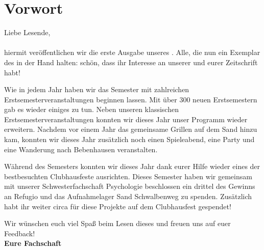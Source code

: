 \section{Vorwort}
\Large
Liebe Lesende,\\
\\
\normalsize
hiermit veröffentlichen wir die erste Ausgabe unseres \nameit. Alle, die nun ein Exemplar des \nameit \space in der Hand halten: schön, dass ihr Interesse an unserer und eurer Zeitschrift habt! 

Wie in jedem Jahr haben wir das Semester mit zahlreichen Erstsemesterveranstaltungen beginnen lassen. Mit über 300 neuen Erstsemestern gab es wieder einiges zu tun.
Neben unseren klassischen Erstsemesterveranstaltungen konnten wir dieses Jahr unser Programm wieder erweitern. Nachdem vor einem Jahr das gemeinsame Grillen auf dem Sand hinzu kam, konnten wir dieses Jahr zusätzlich noch einen Spieleabend, eine Party und eine Wanderung nach Bebenhausen veranstalten.

Während des Semesters konnten wir dieses Jahr dank eurer Hilfe wieder eines der bestbesuchten Clubhausfeste ausrichten. Dieses Semester haben wir gemeinsam mit unserer Schwesterfachschaft Psychologie beschlossen ein drittel des Gewinns an Refugio und das Aufnahmelager Sand Schwalbenweg zu spenden. Zusätzlich habt ihr weiter circa  für diese Projekte auf dem Clubhausfest gespendet! 

Wir wünschen euch viel Spaß beim Lesen dieses \nameit \space und freuen uns auf euer Feedback!\\

\large
\textbf{Eure Fachschaft}
\normalsize